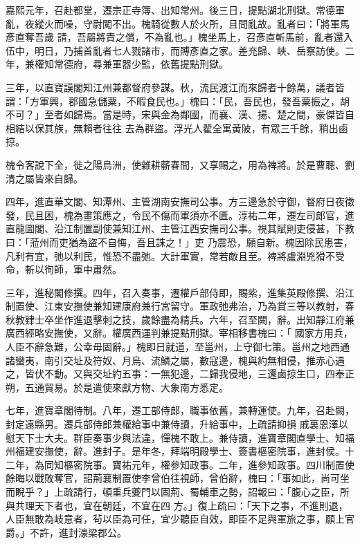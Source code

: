 \begin{pinyinscope}
 嘉熙元年，召赴都堂，遷宗正寺簿、出知常州。後三日，提點湖北刑獄。常德軍亂，夜縱火而噪，守尉闖不出。槐騎從數人於火所，且問亂故。亂者曰：「將軍馬彥直奪吾歲
 請，吾屬將責之償，不為亂也。」槐坐馬上，召彥直斬馬前，亂者還入伍中，明日，乃捕首亂者七人戮諸市，而賻彥直之家。差充歸、峽、岳察訪使。二年，兼權知常德府，尋兼軍器少監，依舊提點刑獄。



 三年，以直寶謨閣知江州兼都督府參謀。秋，流民渡江而來歸者十餘萬，議者皆謂：「方軍興，郡國急儲粟，不暇食民也。」槐曰：「民，吾民也，發吾粟振之，胡不可？」至者如歸焉。當是時，宋與金為鄰國，而襄、漢、揚、楚之間，豪傑皆自相結以保其族，無賴者往往
 去為群盜。浮光人翟全寓黃陂，有眾三千餘，稍出鹵掠。



 槐令客說下全，徙之陽烏洲，使雜耕蘄春間，又享賜之，用為裨將。於是曹聰、劉清之屬皆來自歸。



 四年，進直華文閣、知潭州、主管湖南安撫司公事。方三邊急於守御，督府日夜徵發，民且困，槐為畫策應之，令民不傷而軍須亦不匱。淳祐二年，遷左司郎官，進直龍圖閣、沿江制置副使兼知江州、主管江西安撫司公事。視其賦則吏侵甚，下教曰：「蒞州而吏猶為盜不自悔，吾且誅之！」吏
 乃震恐，願自新。槐因除民患害，凡利有宜，弛以利民，惟恐不盡弛。大計軍實，常若敵且至。裨將盧淵兇猾不受命，斬以徇師，軍中肅然。



 三年，進秘閣修撰。四年，召入奏事，遷權戶部侍即，賜紫，進集英殿修撰、沿江制置使、江東安撫使兼知建康府兼行宮留守。軍政弛弗治，乃為賞三等以教射，春秋教肄士卒坐作進退擊刺之技，歲餘盡為精兵。六年，召至闕，辭。出知靜江府兼廣西經略安撫使，又辭。權廣西運判兼提點刑獄。宰相移書槐曰：「
 國家方用兵，人臣不辭急難，公幸毋固辭。」槐即日就道，至邕州，上守御七策。邕州之地西通諸蠻夷，南引交址及符奴、月烏、流鱗之屬，數寇邊，槐與約無相侵，推赤心遇之，皆伏不動。又與交址約五事：一無犯邊，二歸我侵地，三還鹵掠生口，四奉正朔，五通貿易。於是遣使來獻方物、大象南方悉定。



 七年，進寶章閣待制。八年，遷工部侍郎，職事依舊，兼轉運使。九年，召赴闕，封定遠縣男。遷兵部侍郎兼權給事中兼侍讀，升給事中，上疏請抑損
 戚裏恩澤以慰天下士大夫。群臣奏事少與法違，憚槐不敢上。兼侍讀，進寶章閣直學士、知福州福建安撫使，辭。進封子。是年冬，拜端明殿學士、簽書樞密院事，進封侯。十二年，為同知樞密院事。寶祐元年，權參知政事。二年，進參知政事。四川制置使餘晦以戰敗奪官，詔荊襄制置使李曾伯往視師，曾伯辭，槐曰：「事如此，尚可坐而睨乎？」上疏請行，頓重兵夔門以固荊、蜀輔車之勢，詔報曰：「腹心之臣，所與共理天下者也，宜在朝廷，不宜在四
 方。」復上疏曰：「天下之事，不進則退，人臣無敢為岐意者，茍以臣為可任，宜少聽臣自效，即臣不足與軍旅之事，願上官爵。」不許，進封濠梁郡公。




\end{pinyinscope}
